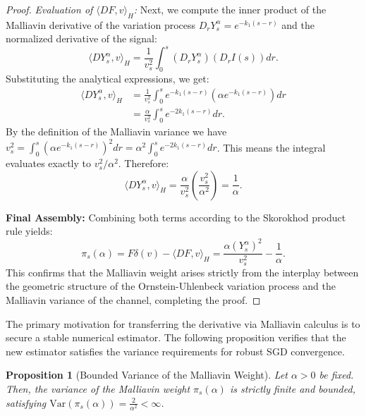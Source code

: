 \documentclass[11pt]{article}
\newtheorem{proposition}{Proposition}
\begin{document}
\begin{proof}
\textit{Evaluation of $\langle DF, v \rangle_H$:}
Next, we compute the inner product of the Malliavin derivative of the variation process $D_r Y_s^\alpha = e^{-k_1(s-r)}$ and the normalized derivative of the signal:
\begin{equation}
    \langle D Y_s^\alpha, v \rangle_H = \frac{1}{v_s^2} \int_0^s (D_r Y_s^\alpha) (D_r I(s)) dr.
\end{equation}
Substituting the analytical expressions, we get:
\begin{align}
    \langle D Y_s^\alpha, v \rangle_H &= \frac{1}{v_s^2} \int_0^s e^{-k_1(s-r)} \left(\alpha e^{-k_1(s-r)}\right) dr \nonumber\\
    &= \frac{\alpha}{v_s^2} \int_0^s e^{-2k_1(s-r)} dr.
\end{align}
By the definition of the Malliavin variance we have $v_s^2 = \int_0^s \left(\alpha e^{-k_1(s-r)}\right)^2 dr = \alpha^2 \int_0^s e^{-2k_1(s-r)} dr$. This means the integral evaluates exactly to $v_s^2 / \alpha^2$. Therefore:
\begin{equation}
    \langle D Y_s^\alpha, v \rangle_H = \frac{\alpha}{v_s^2} \left( \frac{v_s^2}{\alpha^2} \right) = \frac{1}{\alpha}.
\end{equation}

\textbf{Final Assembly:}
Combining both terms according to the Skorokhod product rule yields:
\begin{equation}
    \pi_s(\alpha) = F \delta(v) - \langle DF, v \rangle_H = \frac{\alpha (Y_s^\alpha)^2}{v_s^2} - \frac{1}{\alpha}.
\end{equation}
This confirms that the Malliavin weight arises strictly from the interplay between the geometric structure of the Ornstein-Uhlenbeck variation process and the Malliavin variance of the channel, completing the proof.
\end{proof}

The primary motivation for transferring the derivative via Malliavin calculus is to secure a stable numerical estimator. The following proposition verifies that the new estimator satisfies the variance requirements for robust SGD convergence.

\begin{proposition}[Bounded Variance of the Malliavin Weight]\label{thm:malliavin_bound}
Let $\alpha>0$ be fixed. Then, the variance of the Malliavin weight $\pi_s(\alpha)$ is strictly finite and bounded, satisfying $\text{Var}(\pi_s(\alpha)) = \frac{2}{\alpha^2} < \infty$.
\end{proposition}
\end{document}
